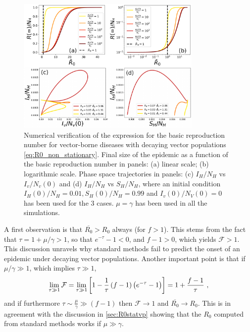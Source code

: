 \begin{figure}[H]
    \centering
    \includegraphics[width=0.8\textwidth]{Figures/R0_check_mean_value.pdf}
    \caption{Numerical verification of the expression for the basic
        reproduction number for vector-borne diseases with decaying vector
        populations
        \cref{eq:R0_non_stationary}. Final size of the epidemic as a function
        of the
        basic reproduction number in panels: (a) linear scale; (b) logarithmic
        scale.
        Phase space trajectories in panels: (c) $I_H/N_H$ vs $I_v/N_v(0)$ and
        (d)
        $I_H/N_H$ vs $S_H/N_H$, where an initial condition $I_H(0)/N_H=0.01,
            S_H(0)/N_H=0.99$ and $I_v(0)/N_V(0)=0$ has been used for the $3$
        cases.
        $\mu=\gamma$ has been used in all the simulations.}
    \label{fig:R0_check_mean_value}
\end{figure}

A first observation is that $\overline{R_0}>R_0$ always (for $f>1$). This
stems from the fact that $\tau=1+\mu/\gamma>1$, so that $e^{-\tau}-1<0$, and
$f-1>0$, which yields $\mathcal{F}>1$. This discussion unravels why standard
methods fail to predict the onset of an epidemic under decaying vector
populations. Another important point is that if $\mu/\gamma\gg 1$, which
implies $\tau\gg1$,
\begin{equation}
    \lim_{\tau\gg1}\mathcal{F}=\lim_{\tau\gg1}\left[1-\frac{1}{\tau}
        \left(f-1\right)\left(e^{-\tau}-1\right)\right]=1+\frac{f-1}{\tau}\
    ,
\end{equation}
and if furthermore $\tau\sim\frac{\mu}{\gamma}\gg (f-1)$ then
$\mathcal{F}\to 1$ and $\overline{R_0}\to R_0$. This is in agreement with the
discussion in \cref{sec:R0statvp} showing that the $R_0$ computed from standard
methods works if $\mu\gg\gamma$.

